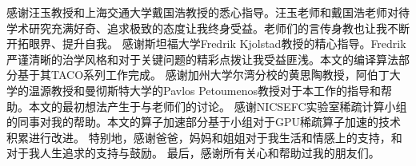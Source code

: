 
\begin{acknowledgements}
  感谢汪玉教授和上海交通大学戴国浩教授的悉心指导。汪玉老师和戴国浩老师对待学术研究充满好奇、追求极致的态度让我终身受益。老师们的言传身教也让我不断开拓眼界、提升自我。
  感谢斯坦福大学Fredrik Kjolstad教授的精心指导。Fredrik严谨清晰的治学风格和对于关键问题的精彩点拨让我受益匪浅。本文的编译算法部分基于其TACO系列工作完成。
  感谢加州大学尔湾分校的黄思陶教授，阿伯丁大学的温源教授和曼彻斯特大学的Pavlos Petoumenos教授对于本工作的指导和帮助。本文的最初想法产生于与老师们的讨论。
  感谢NICSEFC实验室稀疏计算小组的同事对我的帮助。本文的算子加速部分基于小组对于GPU稀疏算子加速的技术积累进行改进。
  特别地，感谢爸爸，妈妈和姐姐对于我生活和情感上的支持，和对于我人生追求的支持与鼓励。
  最后，感谢所有关心和帮助过我的朋友们。
\end{acknowledgements}
